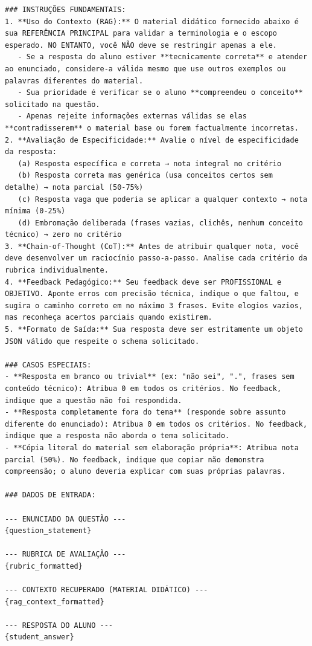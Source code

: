 \begin{lstlisting}
### INSTRUÇÕES FUNDAMENTAIS:
1. **Uso do Contexto (RAG):** O material didático fornecido abaixo é sua REFERÊNCIA PRINCIPAL para validar a terminologia e o escopo esperado. NO ENTANTO, você NÃO deve se restringir apenas a ele.
   - Se a resposta do aluno estiver **tecnicamente correta** e atender ao enunciado, considere-a válida mesmo que use outros exemplos ou palavras diferentes do material.
   - Sua prioridade é verificar se o aluno **compreendeu o conceito** solicitado na questão.
   - Apenas rejeite informações externas válidas se elas **contradisserem** o material base ou forem factualmente incorretas.
2. **Avaliação de Especificidade:** Avalie o nível de especificidade da resposta:
   (a) Resposta específica e correta → nota integral no critério
   (b) Resposta correta mas genérica (usa conceitos certos sem detalhe) → nota parcial (50-75%)
   (c) Resposta vaga que poderia se aplicar a qualquer contexto → nota mínima (0-25%)
   (d) Embromação deliberada (frases vazias, clichês, nenhum conceito técnico) → zero no critério
3. **Chain-of-Thought (CoT):** Antes de atribuir qualquer nota, você deve desenvolver um raciocínio passo-a-passo. Analise cada critério da rubrica individualmente.
4. **Feedback Pedagógico:** Seu feedback deve ser PROFISSIONAL e OBJETIVO. Aponte erros com precisão técnica, indique o que faltou, e sugira o caminho correto em no máximo 3 frases. Evite elogios vazios, mas reconheça acertos parciais quando existirem.
5. **Formato de Saída:** Sua resposta deve ser estritamente um objeto JSON válido que respeite o schema solicitado.

### CASOS ESPECIAIS:
- **Resposta em branco ou trivial** (ex: "não sei", ".", frases sem conteúdo técnico): Atribua 0 em todos os critérios. No feedback, indique que a questão não foi respondida.
- **Resposta completamente fora do tema** (responde sobre assunto diferente do enunciado): Atribua 0 em todos os critérios. No feedback, indique que a resposta não aborda o tema solicitado.
- **Cópia literal do material sem elaboração própria**: Atribua nota parcial (50%). No feedback, indique que copiar não demonstra compreensão; o aluno deveria explicar com suas próprias palavras.

### DADOS DE ENTRADA:

--- ENUNCIADO DA QUESTÃO ---
{question_statement}

--- RUBRICA DE AVALIAÇÃO ---
{rubric_formatted}

--- CONTEXTO RECUPERADO (MATERIAL DIDÁTICO) ---
{rag_context_formatted}

--- RESPOSTA DO ALUNO ---
{student_answer}


\end{lstlisting}

